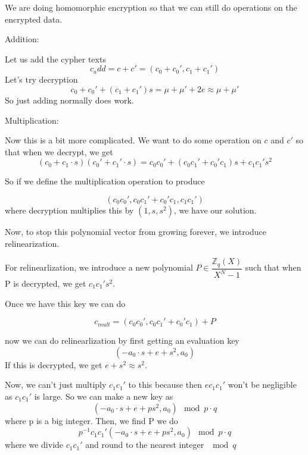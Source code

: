 \documentclass{article}
\begin{document}
	We are doing homomorphic encryption so that we can still do operations on the encrypted data. 
	
	Addition:
	
	Let us add the cypher texts
	\begin{equation}
		c_add=c+c'=(c_0+c_0', c_1+c_1')
	\end{equation}
	Let's try decryption
	\begin{equation}
		c_0+c_0'+(c_1+c_1')s=\mu+\mu'+2e \approx \mu+\mu'
	\end{equation}
	So just adding normally does work.
	
	Multiplication:
	
	Now this is a bit more complicated. We want to do some operation on $c$ and $c'$ so that when we decrypt, we get
	\begin{equation}
		(c_0+c_1\cdot s)(c_0'+c_1'\cdot s)=c_0c_0'+(c_0c_1'+c_0'c_1)s+c_1c_1's^2
	\end{equation}
	
	So if we define the multiplication operation to produce
	
	\begin{equation}
		(c_0c_0', c_0c_1'+c_0'c_1, c_1c_1')
	\end{equation}
	where decryption multiplies this by $(1, s, s^2)$, we have our solution. 
	
	Now, to stop this polynomial vector from growing forever, we introduce relinearization.
	
	For relinearlization, we introduce a new polynomial $P \in \dfrac{\mathbb{Z}_q(X)}{X^N-1}$ such that when P is decrypted, we get $c_1c_1's^2$.
	
	Once we have this key we can do
	
	\begin{equation}
		c_{mult} = (c_0c_0', c_0c_1'+c_0'c_1)+P
	\end{equation}
	
	now we can do relinearlization by first getting an evaluation key
	\begin{equation}
		(-a_0\cdot s+e+s^2, a_0)
	\end{equation}
	If this is decrypted, we get $e+s^2 \approx s^2$.
	
	Now, we can't just multiply $c_1c_1'$ to this because then $ec_1c_1'$ won't be negligible as $c_1c_1'$ is large. So we can make a new key as
	\begin{equation}
		(-a_0\cdot s+e+ps^2, a_0) \mod p\cdot q
	\end{equation}
	where p is a big integer. Then, we find P we do
	\begin{equation}
		p^{-1}c_1c_1'(-a_0\cdot s+e+ps^2, a_0) \mod p\cdot q
	\end{equation}
	where we divide $c_1c_1'$ and round to the nearest integer $\mod q$
	
\end{document}
